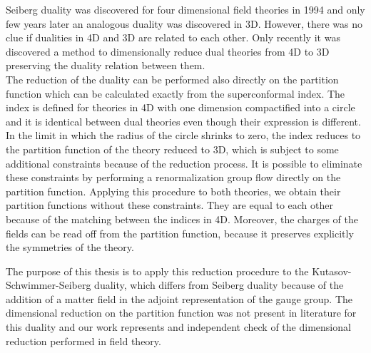 \documentclass[a4paper,12pt]{article}
\begin{document}
Seiberg duality was discovered for four dimensional field theories in 1994 and only few years later an analogous duality was discovered in 3D.
However, there was no clue if dualities in 4D and 3D are related to each other.
Only recently it was discovered a method to dimensionally reduce dual theories from 4D to 3D preserving the duality relation between them.\\
The reduction of the duality can be performed also directly on the partition function which can be calculated exactly from the superconformal index. 
The index is defined for theories in 4D with one dimension compactified into a circle and it is identical between dual theories even though their expression is different.
In the limit in which the radius of the circle shrinks to zero, the index reduces to the partition function of the theory reduced to 3D, which is subject to some additional constraints because of the reduction process.
It is possible to eliminate these constraints by performing a renormalization group flow directly on the partition function.
Applying this procedure to both theories, we obtain their partition functions without these constraints. 
They are equal to each other because of the matching between the indices in 4D.
Moreover, the charges of the fields can be read off from the partition function, because it preserves explicitly the symmetries of the theory.

The purpose of this thesis is to apply this reduction procedure to the Kutasov-Schwimmer-Seiberg duality, which differs from Seiberg duality because of the addition of a matter field in the adjoint representation of the gauge group.
The dimensional reduction on the partition function was not present in literature for this duality and our work represents and independent check of the dimensional reduction performed in field theory.
\end{document}
